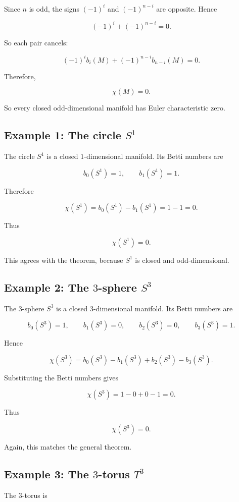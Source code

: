 \documentclass[12pt,a4paper]{article}
\theoremstyle{notespace}
\begin{document}
Since $n$ is odd, the signs $(-1)^i$ and $(-1)^{n-i}$ are opposite. Hence

\[
(-1)^i + (-1)^{n-i}=0.
\]

So each pair cancels:

\[
(-1)^i b_i(M) + (-1)^{n-i} b_{n-i}(M)=0.
\]

Therefore,

\[
\boxed{\chi(M)=0.}
\]

So every closed odd-dimensional manifold has Euler characteristic zero.

\subsection{Example 1: The circle $S^1$}

The circle $S^1$ is a closed $1$-dimensional manifold. Its Betti numbers are

\[
b_0(S^1)=1, \qquad b_1(S^1)=1.
\]

Therefore

\[
\chi(S^1)
=
b_0(S^1)-b_1(S^1)
=
1-1
=
0.
\]

Thus

\[
\boxed{\chi(S^1)=0.}
\]

This agrees with the theorem, because $S^1$ is closed and odd-dimensional.

\subsection{Example 2: The $3$-sphere $S^3$}

The $3$-sphere $S^3$ is a closed $3$-dimensional manifold. Its Betti numbers are

\[
b_0(S^3)=1, \qquad b_1(S^3)=0, \qquad b_2(S^3)=0, \qquad b_3(S^3)=1.
\]

Hence

\[
\chi(S^3)
=
b_0(S^3)-b_1(S^3)+b_2(S^3)-b_3(S^3).
\]

Substituting the Betti numbers gives

\[
\chi(S^3)
=
1-0+0-1
=
0.
\]

Thus

\[
\boxed{\chi(S^3)=0.}
\]

Again, this matches the general theorem.

\subsection{Example 3: The $3$-torus $T^3$}

The $3$-torus is
\end{document}
